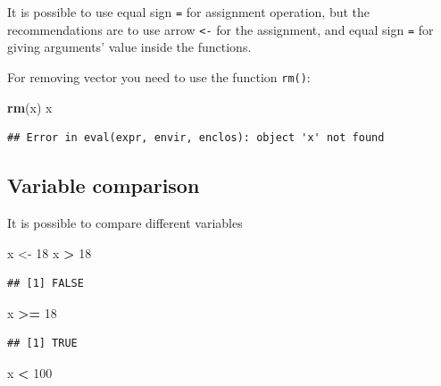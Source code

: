 \documentclass[
]{book}
\newenvironment{Shaded}{\begin{snugshade}}{\end{snugshade}}
\newcommand{\DecValTok}[1]{\textcolor[rgb]{0.00,0.00,0.81}{#1}}
\newcommand{\KeywordTok}[1]{\textcolor[rgb]{0.13,0.29,0.53}{\textbf{#1}}}
\newcommand{\NormalTok}[1]{#1}
\newcommand{\OperatorTok}[1]{\textcolor[rgb]{0.81,0.36,0.00}{\textbf{#1}}}
\newcommand{\StringTok}[1]{\textcolor[rgb]{0.31,0.60,0.02}{#1}}
\begin{document}
It is possible to use equal sign \texttt{=} for assignment operation, but the recommendations are to use arrow \texttt{\textless{}-} for the assignment, and equal sign \texttt{=} for giving arguments' value inside the functions.

For removing vector you need to use the function \texttt{rm()}:

\begin{Shaded}
\begin{Highlighting}[]
\KeywordTok{rm}\NormalTok{(x)}
\NormalTok{x}
\end{Highlighting}
\end{Shaded}

\begin{verbatim}
## Error in eval(expr, envir, enclos): object 'x' not found
\end{verbatim}

\hypertarget{variable-comparison}{%
\subsection{Variable comparison}\label{variable-comparison}}

It is possible to compare different variables

\begin{Shaded}
\begin{Highlighting}[]
\NormalTok{x <-}\StringTok{ }\DecValTok{18}
\NormalTok{x }\OperatorTok{>}\StringTok{ }\DecValTok{18}
\end{Highlighting}
\end{Shaded}

\begin{verbatim}
## [1] FALSE
\end{verbatim}

\begin{Shaded}
\begin{Highlighting}[]
\NormalTok{x }\OperatorTok{>=}\StringTok{ }\DecValTok{18}
\end{Highlighting}
\end{Shaded}

\begin{verbatim}
## [1] TRUE
\end{verbatim}

\begin{Shaded}
\begin{Highlighting}[]
\NormalTok{x }\OperatorTok{<}\StringTok{ }\DecValTok{100}
\end{Highlighting}
\end{Shaded}
\end{document}
